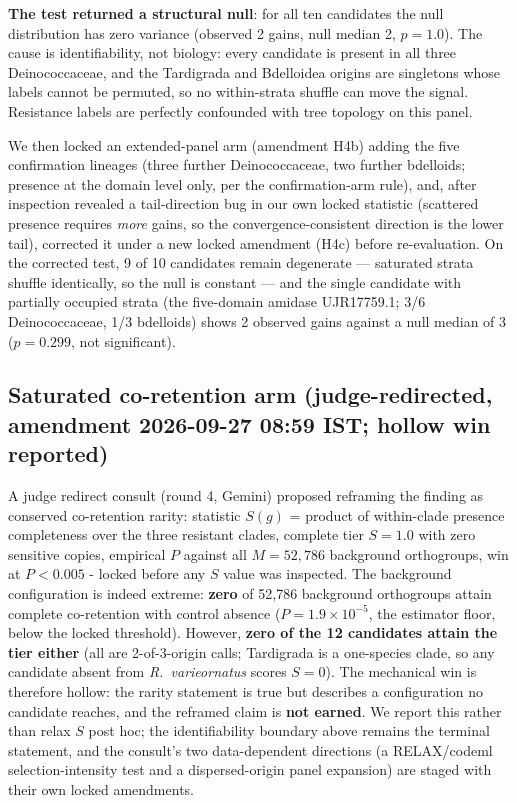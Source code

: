 \documentclass[12pt,a4paper]{article}
\begin{document}
\textbf{The test returned a structural null}: for all ten candidates the null distribution has zero variance (observed 2 gains, null median 2, $p=1.0$). The cause is identifiability, not biology: every candidate is present in all three Deinococcaceae, and the Tardigrada and Bdelloidea origins are singletons whose labels cannot be permuted, so no within-strata shuffle can move the signal. Resistance labels are perfectly confounded with tree topology on this panel.

We then locked an extended-panel arm (amendment H4b) adding the five confirmation lineages (three further Deinococcaceae, two further bdelloids; presence at the domain level only, per the confirmation-arm rule), and, after inspection revealed a tail-direction bug in our own locked statistic (scattered presence requires \emph{more} gains, so the convergence-consistent direction is the lower tail), corrected it under a new locked amendment (H4c) before re-evaluation. On the corrected test, 9 of 10 candidates remain degenerate --- saturated strata shuffle identically, so the null is constant --- and the single candidate with partially occupied strata (the five-domain amidase UJR17759.1; 3/6 Deinococcaceae, 1/3 bdelloids) shows 2 observed gains against a null median of 3 ($p=0.299$, not significant).

\subsection{Saturated co-retention arm (judge-redirected, amendment 2026-09-27 08:59 IST; hollow win reported)}
A judge redirect consult (round 4, Gemini) proposed reframing the finding as conserved co-retention rarity: statistic $S(g)$ = product of within-clade presence completeness over the three resistant clades, complete tier $S=1.0$ with zero sensitive copies, empirical $P$ against all $M=52{,}786$ background orthogroups, win at $P<0.005$ - locked before any $S$ value was inspected. The background configuration is indeed extreme: \textbf{zero} of 52{,}786 background orthogroups attain complete co-retention with control absence ($P=1.9\times10^{-5}$, the estimator floor, below the locked threshold). However, \textbf{zero of the 12 candidates attain the tier either} (all are 2-of-3-origin calls; Tardigrada is a one-species clade, so any candidate absent from \emph{R.\ varieornatus} scores $S=0$). The mechanical win is therefore hollow: the rarity statement is true but describes a configuration no candidate reaches, and the reframed claim is \textbf{not earned}. We report this rather than relax $S$ post hoc; the identifiability boundary above remains the terminal statement, and the consult's two data-dependent directions (a RELAX/codeml selection-intensity test and a dispersed-origin panel expansion) are staged with their own locked amendments.
\end{document}
